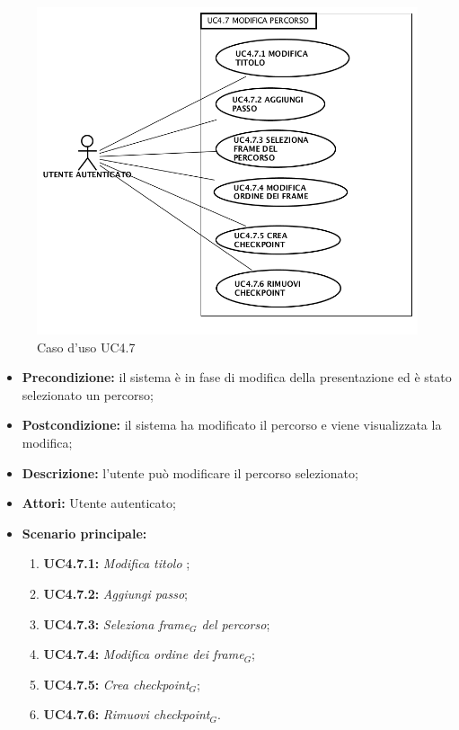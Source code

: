 \begin{figure}[h]
	\begin{center}
	\includegraphics[scale=0.4]{diagram/UC4-7.png}
	\caption{Caso d'uso UC4.7}
	\end{center}
\end{figure}
\begin{itemize}
	\item \textbf{Precondizione:} il sistema è in fase di modifica della presentazione ed è stato selezionato un percorso;
	\item \textbf{Postcondizione:} il sistema ha modificato il percorso e viene visualizzata la modifica;
	\item \textbf{Descrizione:} l'utente può modificare il percorso selezionato;
	\item \textbf{Attori:} Utente autenticato;
	\item \textbf{Scenario principale:}
	\begin{enumerate}
		\item \textbf{ UC4.7.1:} \textit{ Modifica titolo };
		\item \textbf{ UC4.7.2:} \textit{ Aggiungi passo};
		\item \textbf{ UC4.7.3:} \textit{ Seleziona frame$_G$ del percorso};
		\item \textbf{ UC4.7.4:} \textit{ Modifica ordine dei frame$_G$};
		\item \textbf{ UC4.7.5:} \textit{ Crea checkpoint$_G$};
		\item \textbf{ UC4.7.6:} \textit{ Rimuovi checkpoint$_G$}.
	\end{enumerate}
\end{itemize}

